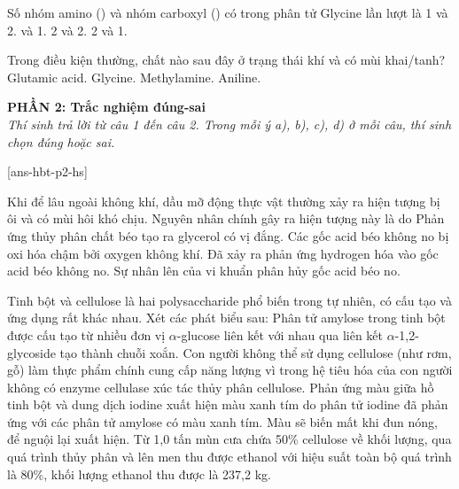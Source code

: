 \documentclass[11pt,a4paper]{article}
\begin{document}
\begin{ex}
Số nhóm amino () và nhóm carboxyl () có trong phân tử Glycine lần lượt là
\choice
{1 và 2.}
{ và 1.}
{2 và 2.}
{2 và 1.}
\end{ex}

\begin{ex}
Trong điều kiện thường, chất nào sau đây ở trạng thái khí và có mùi khai/tanh?
\choice
{Glutamic acid.}
{Glycine.}
{\True Methylamine.}
{Aniline.}
\end{ex}


\vspace{5pt}
\noindent
\textbf{\color{mainGreen}PHẦN 2: Trắc nghiệm đúng-sai}\\
\textit{Thí sinh trả lời từ câu 1 đến câu 2. Trong mỗi ý a), b), c), d) ở mỗi câu, thí sinh chọn đúng hoặc sai.}

[ans-hbt-p2-hs]

\begin{ex}
Khi để lâu ngoài không khí, dầu mỡ động thực vật thường xảy ra hiện tượng bị ôi và có mùi hôi khó chịu. Nguyên nhân chính gây ra hiện tượng này là do
\choiceTF
{Phản ứng thủy phân chất béo tạo ra glycerol có vị đắng.}
{\True Các gốc acid béo không no bị oxi hóa chậm bởi oxygen không khí.}
{Đã xảy ra phản ứng hydrogen hóa vào gốc acid béo không no.}
{Sự nhân lên của vi khuẩn phân hủy gốc acid béo no.}
\end{ex}

\begin{ex}
Tinh bột và cellulose là hai polysaccharide phổ biến trong tự nhiên, có cấu tạo và ứng dụng rất khác nhau. Xét các phát biểu sau:
\choiceTF
{Phân tử amylose trong tinh bột được cấu tạo từ nhiều đơn vị $\alpha$-glucose liên kết với nhau qua liên kết $\alpha$-1,2-glycoside tạo thành chuỗi xoắn.}
{\True Con người không thể sử dụng cellulose (như rơm, gỗ) làm thực phẩm chính cung cấp năng lượng vì trong hệ tiêu hóa của con người không có enzyme cellulase xúc tác thủy phân cellulose.}
{Phản ứng màu giữa hồ tinh bột và dung dịch iodine xuất hiện màu xanh tím do phân tử iodine đã phản ứng với các phân tử amylose có màu xanh tím. Màu sẽ biến mất khi đun nóng, để nguội lại xuất hiện.}
{Từ 1,0 tấn mùn cưa chứa 50\% cellulose về khối lượng, qua quá trình thủy phân và lên men thu được ethanol với hiệu suất toàn bộ quá trình là 80\%, khối lượng ethanol thu được là 237,2 kg.}
\end{ex}

\end{document}
